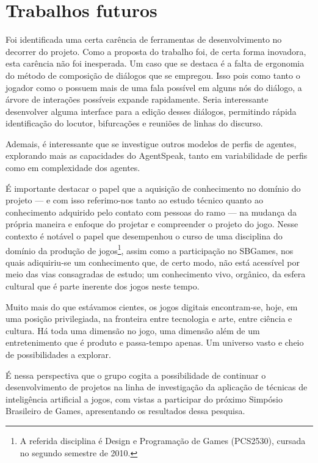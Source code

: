 \section{Trabalhos futuros}

Foi identificada uma certa carência de ferramentas de desenvolvimento no decorrer do projeto.
Como a proposta do trabalho foi, de certa forma inovadora, esta carência não foi inesperada. Um caso que se destaca é a falta de ergonomia do método de composição de diálogos que se empregou. Isso pois como tanto o jogador como o \npc{} possuem mais de uma fala possível em alguns nós do diálogo, a árvore de interações possíveis expande rapidamente. Seria interessante desenvolver alguma interface para a  edição desses diálogos, permitindo rápida identificação do locutor, bifurcações e reuniões de linhas do discurso.

Ademais, é interessante que se investigue outros modelos de perfis de agentes, explorando mais as capacidades do AgentSpeak, tanto em variabilidade de perfis como em complexidade dos agentes.



É importante destacar o papel que a aquisição de conhecimento no
domínio do projeto --- e com isso referimo-nos tanto ao estudo técnico
quanto ao conhecimento adquirido pelo contato com pessoas do ramo ---
na mudança da própria maneira e enfoque do projetar e compreender o
projeto do jogo. Nesse contexto é notável o papel que desempenhou o
curso de uma disciplina do domínio da produção de
jogos\footnote{A referida disciplina é Design e Programação de Games
 (\textsc{PCS2530}), cursada no segundo semestre de 2010.}, assim
como a participação no SBGames, nos quais adiquiriu-se um conhecimento
que, de certo modo, não está acessível por meio das vias consagradas
de estudo; um conhecimento vivo, orgânico, da esfera cultural que é
parte inerente dos jogos neste tempo.

Muito mais do que estávamos cientes, os jogos digitais encontram-se, hoje, em uma posição
privilegiada, na fronteira entre tecnologia e arte, entre ciência e
cultura. Há toda uma dimensão no jogo, uma dimensão além de um
entretenimento que é produto e passa-tempo apenas. Um universo vasto e cheio de possibilidades a explorar.

É nessa perspectiva que o grupo cogita a possibilidade de continuar o desenvolvimento de projetos na linha de investigação da aplicação de técnicas de inteligência artificial a jogos, com vistas a participar do próximo Simpósio Brasileiro de Games, apresentando os resultados dessa pesquisa.
